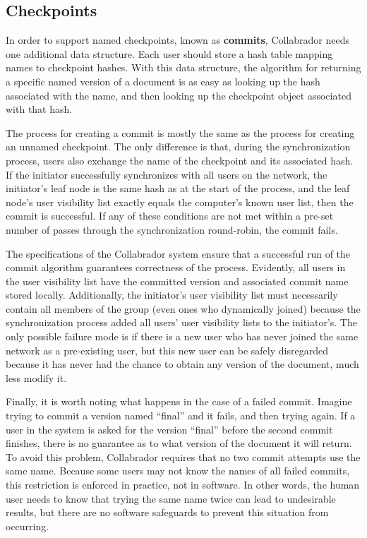 \documentclass[11pt,titlepage]{article}
\begin{document}
\subsection{Checkpoints}

In order to support named checkpoints, known as \textbf{commits}, Collabrador needs one additional data structure. Each user should store a hash table mapping names to checkpoint hashes. With this data structure, the algorithm for returning a specific named version of a document is as easy as looking up the hash associated with the name, and then looking up the checkpoint object associated with that hash.

The process for creating a commit is mostly the same as the process for creating an unnamed checkpoint. The only difference is that, during the synchronization process, users also exchange the name of the checkpoint and its associated hash. If the initiator successfully synchronizes with all users on the network, the initiator's leaf node is the same hash as at the start of the process, and the leaf node's user visibility list exactly equals the computer's known user list, then the commit is successful. If any of these conditions are not met within a pre-set number of passes through the synchronization round-robin, the commit fails.

The specifications of the Collabrador system ensure that a successful run of the commit algorithm guarantees correctness of the process. Evidently, all users in the user visibility list have the committed version and associated commit name stored locally. Additionally, the initiator's user visibility list must necessarily contain all members of the group (even ones who dynamically joined) because the synchronization process added all users' user visibility lists to the initiator's. The only possible failure mode is if there is a new user who has never joined the same network as a pre-existing user, but this new user can be safely disregarded because it has never had the chance to obtain any version of the document, much less modify it.

Finally, it is worth noting what happens in the case of a failed commit. Imagine trying to commit a version named ``final'' and it fails, and then trying again. If a user in the system is asked for the version ``final'' before the second commit finishes, there is no guarantee as to what version of the document it will return. To avoid this problem, Collabrador requires that no two commit attempts use the same name. Because some users may not know the names of all failed commits, this restriction is enforced in practice, not in software. In other words, the human user needs to know that trying the same name twice can lead to undesirable results, but there are no software safeguards to prevent this situation from occurring.
\end{document}
